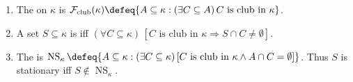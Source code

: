 \begin{definition} \label{def:club-filter-stationary-and-nonstationary} 
\begin{enumerate}[label=(\roman*)]
\setlength{\itemsep}{0pt}
\item The  on $\kappa$ is $\mathcal{F}_{\mathrm{club}}(\kappa)\defeq\{A\subseteq\kappa:(\exists C\subseteq A)\,C\text{ is club in }\kappa\}$.
\item A set $S\subseteq\kappa$ is  iff $(\forall C\subseteq\kappa)\,[C\text{ is club in }\kappa\Rightarrow S\cap C\neq\emptyset]$.
\item The  is $\operatorname{NS}_{\kappa}\defeq\{A\subseteq\kappa:(\exists C\subseteq\kappa)\,[C\text{ is club in }\kappa\land A\cap C=\emptyset]\}$. Thus $S$ is stationary iff $S\notin\operatorname{NS}_{\kappa}$.
\end{enumerate}
\end{definition}

